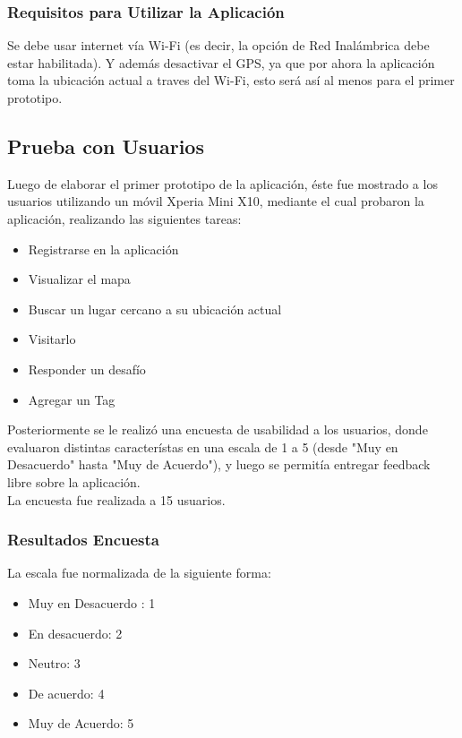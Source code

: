 \documentclass[10pt,letterpaper]{article}
\begin{document}
\subsubsection{Requisitos para Utilizar la Aplicación}

Se debe usar internet vía Wi-Fi (es decir, la opción de Red Inalámbrica debe estar habilitada). Y además desactivar el GPS, ya que por ahora la aplicación toma la ubicación actual a traves del Wi-Fi, esto será así al menos para el primer prototipo.

\newpage
\subsection{Prueba con Usuarios}

Luego de elaborar el primer prototipo de la aplicación, éste fue mostrado a los usuarios utilizando un móvil Xperia Mini X10, mediante el cual probaron la aplicación, realizando las siguientes tareas:\\

\begin{itemize}
 \item Registrarse en la aplicación
 \item Visualizar el mapa
 \item Buscar un lugar cercano a su ubicación actual
 \item Visitarlo
 \item Responder un desafío
 \item Agregar un Tag
\end{itemize}


Posteriormente se le realizó una encuesta de usabilidad a los usuarios, donde evaluaron distintas característas en una escala de 1 a 5 (desde "Muy en Desacuerdo" hasta "Muy de Acuerdo"), y luego se permitía entregar feedback libre sobre la aplicación.\\

La encuesta fue realizada a 15 usuarios.\\

\subsubsection{Resultados Encuesta}

La escala fue normalizada de la siguiente forma:

\begin{itemize}
\item Muy en Desacuerdo : 1
\item En desacuerdo: 2
\item Neutro: 3
\item De acuerdo: 4
\item Muy de Acuerdo: 5
\end{itemize}
\end{document}

